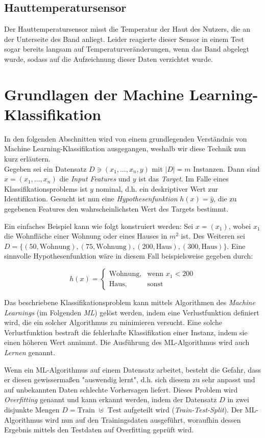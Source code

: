 \subsection{Hauttemperatursensor}
Der Hauttemperatursensor misst die Temperatur der Haut des Nutzers, die an der Unterseite des Band anliegt. Leider reagierte dieser Sensor in einem Test sogar bereits langsam auf Temperaturveränderungen, wenn das Band abgelegt wurde, sodass auf die Aufzeichnung dieser Daten verzichtet wurde.

\section{Grundlagen der Machine Learning-Klassifikation}
In den folgenden Abschnitten wird von einem grundlegenden Verständnis von Machine Learning-Klassifikation ausgegangen, weshalb wir diese Technik nun kurz erläutern. \\
Gegeben sei ein Datensatz $D \ni (x_1, ..., x_n, y)$ mit $|D| = m$ Instanzen. Dann sind $x = (x_1, ..., x_n)$ die \textit{Input Features} und $y$ ist das \textit{Target}. Im Falle eines Klassifikationsproblems ist $y$ nominal, d.h. ein deskriptiver Wert zur Identifikation. Gesucht ist nun eine \textit{Hypothesenfunktion} $h(x) = \hat{y}$, die zu gegebenen Features den wahrscheinlichsten Wert des Targets bestimmt\cite{Ng2011a}.

Ein einfaches Beispiel kann wie folgt konstruiert werden: Sei $x = (x_1)$, wobei $x_1$ die Wohnfläche einer Wohnung oder eines Hauses in $m^2$ ist. Des Weiteren sei $D = \{(50, \text{Wohnung}), (75, \text{Wohnung}), (200, \text{Haus}), (300, \text{Haus})\}$. Eine sinnvolle Hypothesenfunktion wäre in diesem Fall beispielsweise gegeben durch:

\[
h(x) = 
\begin{cases}
\text{Wohnung}, & \text{wenn } x_1 < 200 \\
\text{Haus}, & \text{sonst}
\end{cases}
\]

Das beschriebene Klassifikationsproblem kann mittels Algorithmen des \textit{Machine Learnings} (im Folgenden \textit{ML}) gelöst werden, indem eine Verlustfunktion definiert wird, die ein solcher Algorithmus zu minimieren versucht. Eine solche Verlustfunktion bestraft die fehlerhafte Klassifikation einer Instanz, indem sie einen höheren Wert annimmt. Die Ausführung des ML-Algorithmus wird auch \textit{Lernen} genannt.

Wenn ein ML-Algorithmus auf einem Datensatz arbeitet, besteht die Gefahr, dass er diesen gewissermaßen "auswendig lernt", d.h. sich diesem zu sehr anpasst und auf unbekannten Daten schlechte Vorhersagen liefert. Dieses Problem wird \textit{Overfitting} genannt und kann erkannt werden, indem der Datensatz $D$ in zwei disjunkte Mengen $D = \text{Train } \uplus \text{ Test}$ aufgeteilt wird (\textit{Train-Test-Split}). Der ML-Algorithmus wird nun auf den Trainingsdaten ausgeführt, woraufhin dessen Ergebnis mittels den Testdaten auf Overfitting geprüft wird.

